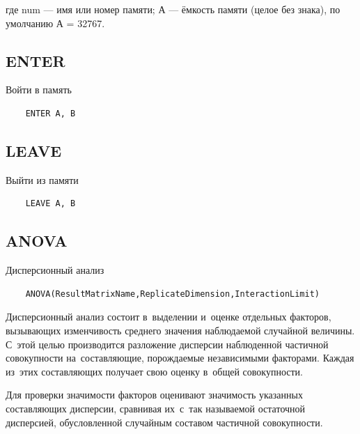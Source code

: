 \documentclass[14pt]{extarticle}
\begin{document}
где num — имя или номер памяти;
А — ёмкость памяти (целое без знака), по умолчанию А = 32767.

\subsection*{ENTER}

Войти в память

\begin{lstlisting}
	ENTER A, B
\end{lstlisting}

\subsection*{LEAVE}

Выйти из памяти

\begin{lstlisting}
	LEAVE A, B
\end{lstlisting}

\subsection*{ANOVA}

Дисперсионный анализ

\begin{lstlisting}
	ANOVA(ResultMatrixName,ReplicateDimension,InteractionLimit)
\end{lstlisting}

Дисперсионный анализ состоит в выделении и оценке отдельных факторов, вызывающих изменчивость среднего значения наблюдаемой случайной величины. С этой целью производится разложение дисперсии наблюденной частичной совокупности на составляющие, порождаемые независимыми факторами. Каждая из этих составляющих получает свою оценку в общей совокупности.

Для проверки значимости факторов оценивают значимость указанных составляющих дисперсии, сравнивая их с так называемой остаточной дисперсией, обусловленной случайным составом частичной совокупности.
\end{document}
